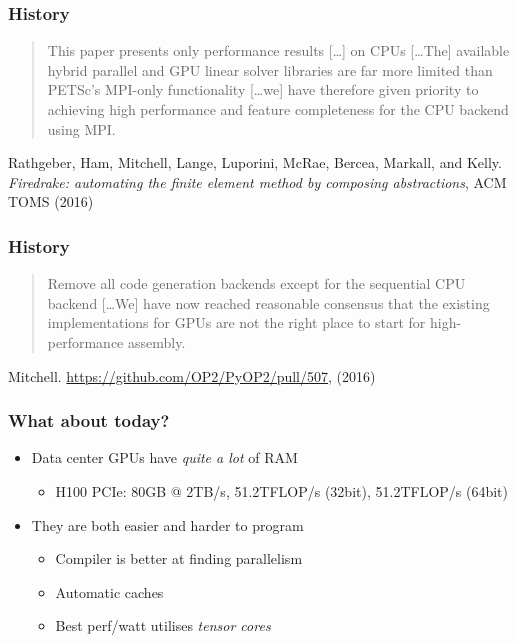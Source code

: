 \documentclass[aspectratio=169]{beamer}
\begin{document}
\begin{frame}
  \frametitle{History}
  \begin{quote}
    This paper presents only performance results [\dots] on CPUs
    [\dots The] available hybrid parallel and GPU linear solver
    libraries are far more limited than PETSc’s MPI-only functionality
    [\dots we] have therefore given priority to achieving high
    performance and feature completeness for the CPU backend using
    MPI.\@
  \end{quote}
  {
    \scriptsize
    \raggedleft
    Rathgeber, Ham, Mitchell, Lange, Luporini, McRae, Bercea, Markall,
    and Kelly. \emph{Firedrake: automating the finite element method
      by composing abstractions}, ACM TOMS (2016)
    \par
  }
\end{frame}

\begin{frame}
  \frametitle{History}
  \begin{quote}
    Remove all code generation backends except for the sequential CPU
    backend [\dots We]
    have now reached reasonable consensus that the existing
    implementations for GPUs are not the right place to start for
    high-performance assembly.
  \end{quote}
  {
    \scriptsize
    \raggedleft
    Mitchell. \url{https://github.com/OP2/PyOP2/pull/507}, (2016)
    \par
  }
\end{frame}

\begin{frame}
  \frametitle{What about today?}

  \begin{itemize}
  \item Data center GPUs have \emph{quite a lot} of RAM
    \begin{itemize}
    \item H100 PCIe: 80GB @ 2TB/s, 51.2TFLOP/s (32bit), 51.2TFLOP/s (64bit)
    \end{itemize}
  \item They are both easier and harder to program
    \begin{itemize}
    \item Compiler is better at finding parallelism
    \item Automatic caches
    \item Best perf/watt utilises \emph{tensor cores}
    \end{itemize}
  \end{itemize}
\end{frame}
\end{document}
